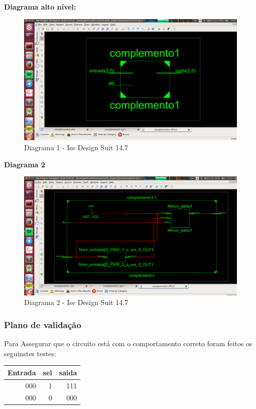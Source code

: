 \documentclass[12pts]{article}
\begin{document}
\textbf{Diagrama alto nível:}

\begin{figure}[!htb]
  \centering
  \includegraphics[scale=0.3	]{imagens/complementoSc1}
  \caption{Diagrama 1 - Ise Design Suit 14.7}
  \label{figRotulo}
\end{figure}

\newpage
\textbf{Diagrama 2 }

\begin{figure}[!htb]
  \centering
  \includegraphics[scale=0.3	]{imagens/complementoSc2}
  \caption{Diagrama 2 - Ise Design Suit 14.7}
  \label{figRotulo}
\end{figure}


\subsubsection{Plano de validação}

Para Assegurar que o circuito está com o comportamento correto foram feitos os seguinstes testes:

\begin{center}
	\begin{tabular}{|r|r|r|}
		\hline
		Entrada & sel & saida \\
		\hline
		000 & 1 & 111 \\
		\hline
		000 & 0 & 000 \\
		\hline
	\end{tabular}
\end{center}
\end{document}
